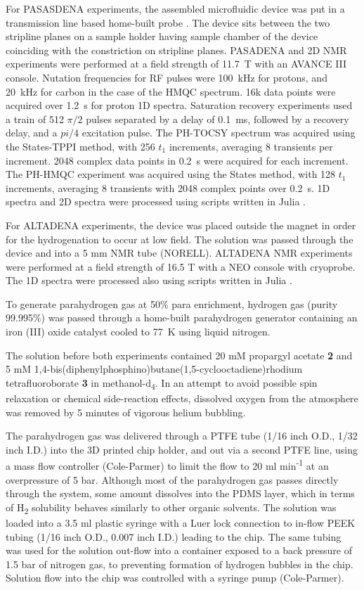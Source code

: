 For PASASDENA experiments, the assembled microfluidic device was put in a transmission line based
home-built probe \cite{sharma2019modular}. The
device sits between the two stripline planes on a sample holder having
sample chamber of the device coinciding with the constriction on
stripline planes. PASADENA and 2D NMR experiments were performed at a field strength
of 11.7~T with an AVANCE III console. Nutation frequencies for RF pulses
were 100~kHz for protons, and 20~kHz for carbon in the case of the HMQC
spectrum. 16k data points were acquired over 1.2~s for proton 1D spectra.
Saturation recovery experiments used a train of 512 $\pi/2$ pulses
separated by a delay of 0.1~ms, followed by a recovery delay, and a $pi/4$
excitation pulse.
The PH-TOCSY spectrum was acquired using the States-TPPI method,
with 256 $t_1$ increments, averaging 8 transients per increment.
2048 complex data points in 0.2~s were acquired for each increment.
The PH-HMQC experiment was acquired using the States method, with
128 $t_1$ increments, averaging 8 transients with 2048 complex points
over 0.2~s. 1D spectra and
2D spectra were processed using scripts written in Julia \cite{Bezanson:2017gd}.

For ALTADENA experiments, the device was placed outside the magnet in order
for the hydrogenation to occur at low field. The solution was passed through the
device and into a 5 mm NMR tube (NORELL). ALTADENA NMR experiments were performed at
a field strength of 16.5 T with a NEO console with cryoprobe. The 1D spectra
were processed also using scripts written in Julia \cite{Bezanson:2017gd}.

To generate parahydrogen gas at 50\% para enrichment, hydrogen gas
(purity 99.995\%) was passed through a home-built parahydrogen generator
containing an iron (III) oxide catalyst cooled to 77~K using liquid
nitrogen.

The solution before both experiments contained 20 mM propargyl acetate \textbf{2}
and 5 mM
1,4-bis(diphenyl\-phosphino)\-butane(1,5-cyclo\-octadiene)\-rhodium
tetra\-fluoro\-borate \textbf{3} in methanol-d\textsubscript{4}. In an attempt to
avoid possible spin relaxation or chemical side-reaction effects,
dissolved oxygen from the atmosphere was removed by 5 minutes of
vigorous helium bubbling.

The parahydrogen gas was delivered through a PTFE tube (1/16 inch O.D.,
1/32 inch I.D.) into the 3D printed chip holder, and out via a second
PTFE line, using a mass flow controller (Cole-Parmer) to limit the flow
to 20 ml min\textsuperscript{-1} at an overpressure of 5 bar. Although
most of the parahydrogen gas passes directly through the system, some
amount dissolves into the PDMS layer, which in terms of
H\textsubscript{2} solubility behaves similarly to other organic
solvents. The solution was loaded into a 3.5 ml plastic syringe with a
Luer lock connection to in-flow PEEK tubing (1/16 inch O.D., 0.007 inch
I.D.) leading to the chip. The same tubing was used for the solution
out-flow into a container exposed to a back pressure of 1.5 bar of
nitrogen gas, to preventing formation of hydrogen bubbles in the chip.
Solution flow into the chip was controlled with a syringe pump (Cole-Parmer).

